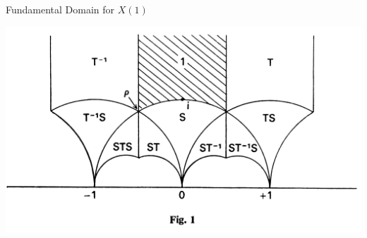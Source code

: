 \begin{frame}{Fundamental Domain for $X(1)$}

\includegraphics[scale=0.10]{slides/fun-domain-SL2.png}



\end{frame}

